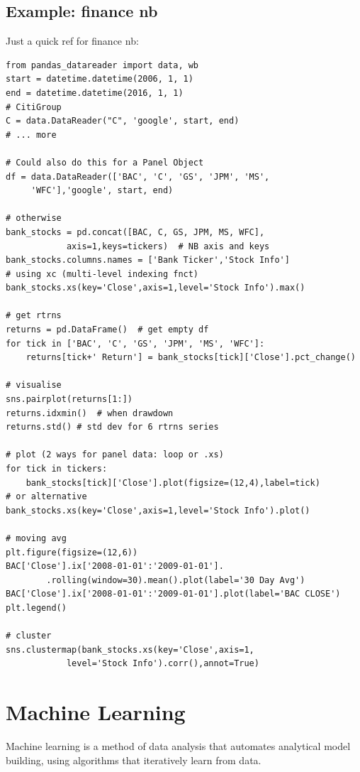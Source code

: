 \documentclass[11pt]{article}
\begin{document}
\subsection{Example: finance nb}
Just a quick ref for finance nb:
\begin{lstlisting}
from pandas_datareader import data, wb
start = datetime.datetime(2006, 1, 1)
end = datetime.datetime(2016, 1, 1)
# CitiGroup
C = data.DataReader("C", 'google', start, end)
# ... more

# Could also do this for a Panel Object
df = data.DataReader(['BAC', 'C', 'GS', 'JPM', 'MS',
	 'WFC'],'google', start, end)

# otherwise
bank_stocks = pd.concat([BAC, C, GS, JPM, MS, WFC],
			axis=1,keys=tickers)  # NB axis and keys
bank_stocks.columns.names = ['Bank Ticker','Stock Info']
# using xc (multi-level indexing fnct)
bank_stocks.xs(key='Close',axis=1,level='Stock Info').max()

# get rtrns
returns = pd.DataFrame()  # get empty df
for tick in ['BAC', 'C', 'GS', 'JPM', 'MS', 'WFC']:  
	returns[tick+' Return'] = bank_stocks[tick]['Close'].pct_change()

# visualise
sns.pairplot(returns[1:])
returns.idxmin()  # when drawdown
returns.std() # std dev for 6 rtrns series

# plot (2 ways for panel data: loop or .xs)
for tick in tickers:
	bank_stocks[tick]['Close'].plot(figsize=(12,4),label=tick)
# or alternative
bank_stocks.xs(key='Close',axis=1,level='Stock Info').plot()

# moving avg
plt.figure(figsize=(12,6))
BAC['Close'].ix['2008-01-01':'2009-01-01'].
		.rolling(window=30).mean().plot(label='30 Day Avg')
BAC['Close'].ix['2008-01-01':'2009-01-01'].plot(label='BAC CLOSE')
plt.legend()

# cluster
sns.clustermap(bank_stocks.xs(key='Close',axis=1,
			level='Stock Info').corr(),annot=True)
\end{lstlisting}

\section{Machine Learning} \label{sec:Machine}
Machine learning is a method of data analysis that automates analytical model building, using algorithms that iteratively learn from data.
\end{document}
